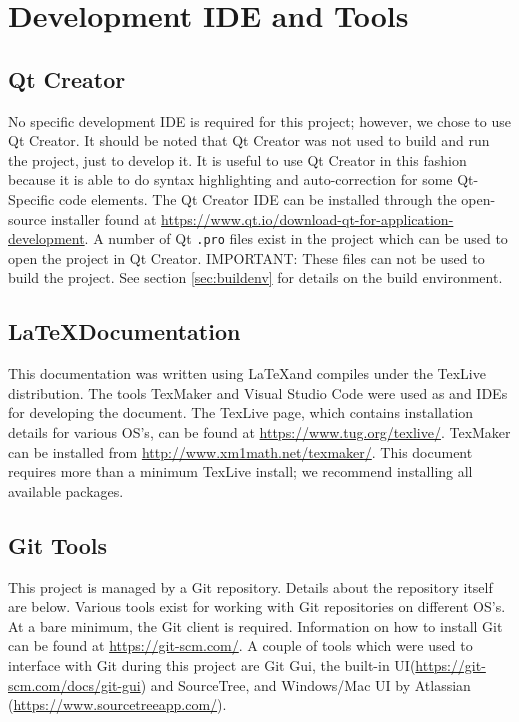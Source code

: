 \section{Development IDE and Tools}
\subsection{Qt Creator}
No specific development IDE is required for this project; however, we chose to use Qt Creator. It should be noted that Qt Creator was not used to build and run the project, just to develop it. It is useful to use Qt Creator in this fashion because it is able to do syntax highlighting and auto-correction for some Qt-Specific code elements. The Qt Creator IDE can be installed through the open-source installer found at \url{https://www.qt.io/download-qt-for-application-development}. A number of Qt \lstinline|.pro| files exist in the project which can be used to open the project in Qt Creator. IMPORTANT: These files can not be used to build the project. See section \ref{sec:buildenv} for details on the build environment.

\subsection{\LaTeX Documentation}
This documentation was written using \LaTeX and compiles under the TexLive distribution. The tools TexMaker and Visual Studio Code were used as and IDEs for developing the document.
The TexLive page, which contains installation details for various OS's, can be found at \url{https://www.tug.org/texlive/}. TexMaker can be installed from \url{http://www.xm1math.net/texmaker/}. This document requires more than a minimum TexLive install; we recommend installing all available packages.

\subsection{Git Tools}
This project is managed by a Git repository. Details about the repository itself are below. Various tools exist for working with Git repositories on different OS's. At a bare minimum, the Git client is required. Information on how to install Git can be found at \url{https://git-scm.com/}. A couple of tools which were used to interface with Git during this project are Git Gui, the built-in UI(\url{https://git-scm.com/docs/git-gui}) and SourceTree, and Windows/Mac UI by Atlassian (\url{https://www.sourcetreeapp.com/}).

